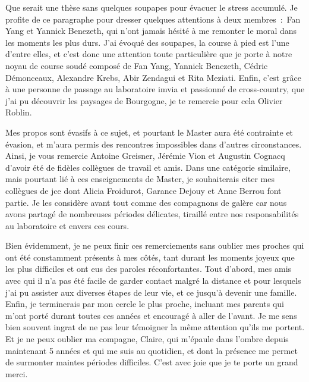 \documentclass[english,standardlists]{spimubphdthesis}
\begin{document}
Que serait une thèse sans quelques soupapes pour évacuer le stress accumulé. Je profite de ce paragraphe pour dresser quelques attentions à deux membres~:~Fan Yang et Yannick Benezeth, qui n'ont jamais hésité à me remonter le moral dans les moments les plus durs. J'ai évoqué des soupapes, la course à pied est l'une d'entre elles, et c'est donc une attention toute particulière que je porte à notre noyau de course soudé composé de Fan Yang, Yannick Benezeth, Cédric Démonceaux, Alexandre Krebs, Abir Zendagui et Rita Meziati. Enfin, c'est grâce à une personne de passage au laboratoire \gls{imvia} et passionné de cross-country, que j'ai pu découvrir les paysages de Bourgogne, je te remercie pour cela Olivier Roblin.\par

Mes propos sont évasifs à ce sujet, et pourtant le Master aura été contrainte et évasion, et m'aura permis des rencontres impossibles dans d'autres circonstances. Ainsi, je vous remercie Antoine Greisner, Jérémie Vion et Augustin Cognacq d'avoir été de fidèles collègues de travail et amis. Dans une catégorie similaire, mais pourtant lié à ces enseignements de Master, je souhaiterais citer mes collègues de \gls{jce} dont Alicia Froidurot, Garance Dejouy et Anne Berrou font partie. Je les considère avant tout comme des compagnons de galère car nous avons partagé de nombreuses périodes délicates, tiraillé entre nos responsabilités au laboratoire et envers ces cours.\par
 
Bien évidemment, je ne peux finir ces remerciements sans oublier mes proches qui ont été constamment présents à mes côtés, tant durant les moments joyeux que les plus difficiles et ont eus des paroles réconfortantes. Tout d'abord, mes amis avec qui il n'a pas été facile de garder contact malgré la distance et pour lesquels j'ai pu assister aux diverses étapes de leur vie, et ce jusqu'à devenir une famille. Enfin, je terminerais par mon cercle le plus proche, incluant mes parents qui m'ont porté durant toutes ces années et encouragé à aller de l'avant. Je me sens bien souvent ingrat de ne pas leur témoigner la même attention qu'ils me portent. Et je ne peux oublier ma compagne, Claire, qui m'épaule dans l'ombre depuis maintenant 5 années et qui me suis au quotidien, et dont la présence me permet de surmonter maintes périodes difficiles. C'est avec joie que je te porte un grand merci.\par
		
\tableofcontents
\end{document}
